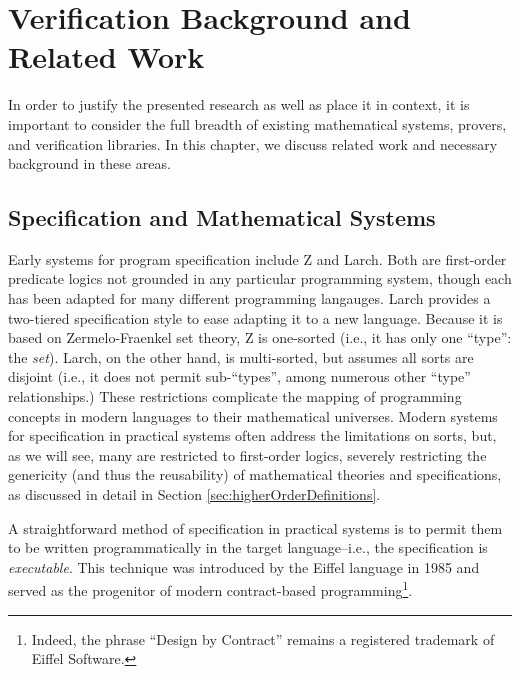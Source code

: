 \chapter{Verification Background and Related Work}\label{sec:background}

In order to justify the presented research as well as place it in context, it is important to consider the full breadth of existing mathematical systems, provers, and verification libraries.  In this chapter, we discuss related work and necessary background in these areas.

\section{Specification and Mathematical Systems}\label{sec:overviewSpec}
Early systems for program specification include Z\cite{dillerZ} and Larch\cite{guttagLarch}.  Both are first-order predicate logics not grounded in any particular programming system, though each has been adapted for many different programming langauges.  Larch provides a two-tiered specification style to ease adapting it to a new language.  Because it is based on Zermelo-Fraenkel set theory, Z is one-sorted (i.e., it has only one ``type'': the \emph{set}).  Larch, on the other hand, is multi-sorted, but assumes all sorts are disjoint (i.e., it does not permit sub-``types'', among numerous other ``type'' relationships.)  These restrictions complicate the mapping of programming concepts in modern languages to their mathematical universes.  Modern systems for specification in practical systems often address the limitations on sorts, but, as we will see, many are restricted to first-order logics, severely restricting the genericity (and thus the reusability) of mathematical theories and specifications, as discussed in detail in Section \ref{sec:higherOrderDefinitions}.

A straightforward method of specification in practical systems is to permit them to be written programmatically in the target language--i.e., the specification is \emph{executable}.  This technique was introduced by the Eiffel language\cite{eiffel} in 1985 and served as the progenitor of modern contract-based programming\footnote{Indeed, the phrase ``Design by Contract'' remains a registered trademark of Eiffel Software.}.

